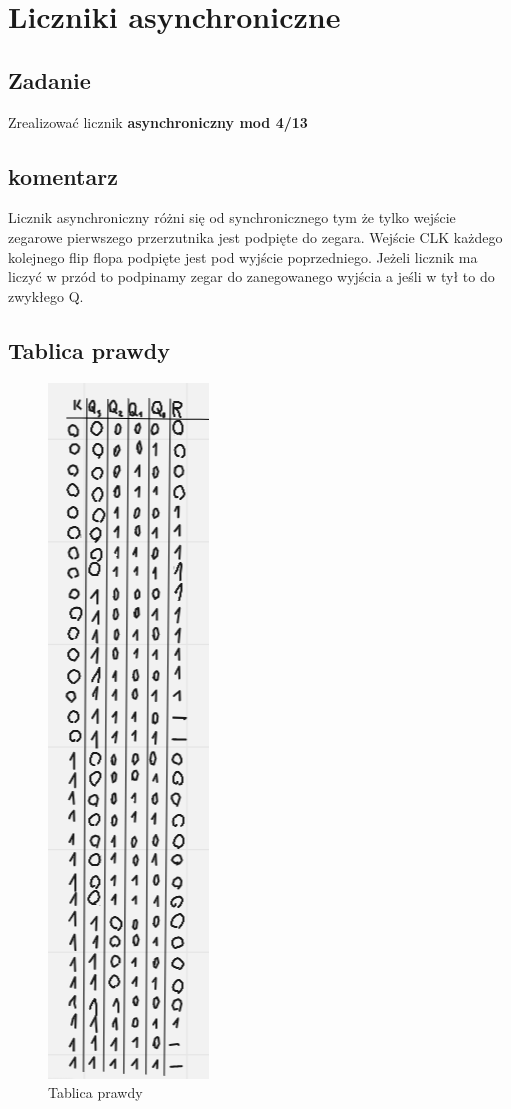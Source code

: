 \section{Liczniki asynchroniczne}

\subsection{Zadanie}

Zrealizować licznik \textbf{asynchroniczny mod 4/13}

\subsection{komentarz}

Licznik asynchroniczny różni się od synchronicznego tym że tylko wejście zegarowe pierwszego przerzutnika jest podpięte do zegara. Wejście CLK każdego kolejnego flip flopa podpięte jest pod wyjście poprzedniego. Jeżeli licznik ma liczyć w przód to podpinamy zegar do zanegowanego wyjścia a jeśli w tył to do zwykłego Q.

\subsection{Tablica prawdy}

\begin{figure}[h!]
    \centering
    \includegraphics[width = .2\textwidth]{images/async/async_t.png}
    \caption{Tablica prawdy}
    \label{fig:my_label}
\end{figure}

